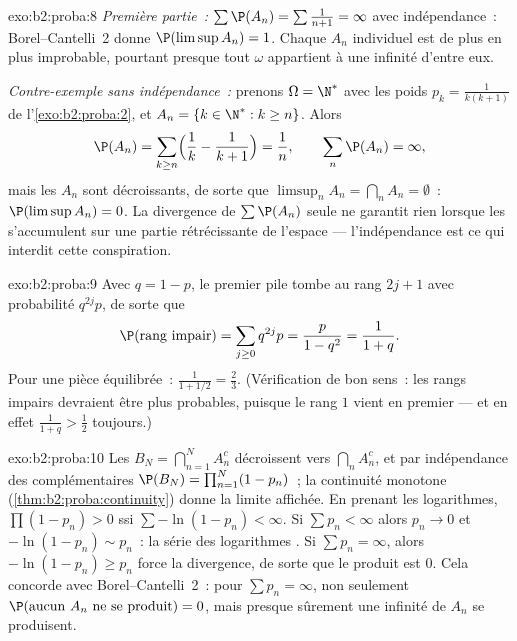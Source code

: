\begin{solution}{exo:b2:proba:8}
\emph{Première partie~:} $\sum \P(A_n) = \sum\frac{1}{n+1} = \infty$
avec indépendance~: Borel--Cantelli~2 donne $\P(\limsup A_n) = 1$.
Chaque $A_n$ individuel est de plus en plus improbable, pourtant presque tout
$\omega$ appartient à une infinité d'entre eux.

\emph{Contre-exemple sans indépendance~:} prenons $\Omega = \N^*$
avec les poids $p_k = \frac{1}{k(k+1)}$ de
l'\cref{exo:b2:proba:2}, et $A_n = \{k \in \N^* : k \geq n\}$.
Alors
\[
\P(A_n) = \sum_{k \geq n}\Bigl(\frac1k - \frac1{k+1}\Bigr)
= \frac1n ,
\qquad
\sum_n \P(A_n) = \infty ,
\]
mais les $A_n$ sont décroissants, de sorte que $\limsup_n A_n = \bigcap_n A_n =
\emptyset$~: $\P(\limsup A_n) = 0$. La divergence de $\sum\P(A_n)$
seule ne garantit rien lorsque les  s'accumulent sur une partie
rétrécissante de l'espace --- l'indépendance est ce qui interdit cette
conspiration.
\end{solution}

\begin{solution}{exo:b2:proba:9}
Avec $q = 1 - p$, le premier pile tombe au rang $2j + 1$ avec
probabilité $q^{2j}p$, de sorte que
\[
\P(\text{rang impair}) = \sum_{j\geq0}q^{2j}p
= \frac{p}{1 - q^2} = \frac{1}{1 + q} .
\]
Pour une pièce équilibrée~: $\frac1{1 + 1/2} = \frac23$. (Vérification de bon sens~:
les rangs impairs devraient être plus probables, puisque le rang $1$ vient en premier ---
et en effet $\frac1{1+q} > \frac12$ toujours.)
\end{solution}

\begin{solution}{exo:b2:proba:10}
Les  $B_N = \bigcap_{n=1}^N A_n^c$ décroissent vers
$\bigcap_nA_n^c$, et par indépendance des complémentaires
$\P(B_N) = \prod_{n=1}^N(1 - p_n)$~; la continuité monotone
(\cref{thm:b2:proba:continuity}) donne la limite affichée.
En prenant les logarithmes, $\prod(1 - p_n) > 0$ ssi $\sum-\ln(1 -
p_n) < \infty$. Si $\sum p_n < \infty$ alors $p_n \to 0$ et
$-\ln(1 - p_n) \sim p_n$~: la série des logarithmes . Si
$\sum p_n = \infty$, alors $-\ln(1 - p_n) \geq p_n$ force la
divergence, de sorte que le produit est $0$. Cela concorde avec
Borel--Cantelli~2~: pour $\sum p_n = \infty$, non seulement
$\P(\text{aucun }A_n\text{ ne se produit}) = 0$, mais presque sûrement
une infinité de $A_n$ se produisent.
\end{solution}

